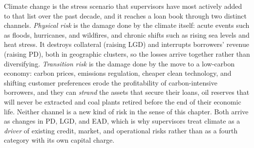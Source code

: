 \documentclass[../ai_in_finance]{subfiles}
\begin{document}
Climate change is the stress scenario that supervisors have most actively added to that list over the past decade, and it reaches a loan book through two distinct channels. \emph{Physical risk} is the damage done by the climate itself: acute events such as floods, hurricanes, and wildfires, and chronic shifts such as rising sea levels and heat stress. It destroys collateral (raising LGD) and interrupts borrowers' revenue (raising PD), both in geographic clusters, so the losses arrive together rather than diversifying. \emph{Transition risk} is the damage done by the move to a low-carbon economy: carbon prices, emissions regulation, cheaper clean technology, and shifting customer preferences erode the profitability of carbon-intensive borrowers, and they can \emph{strand} the assets that secure their loans, oil reserves that will never be extracted and coal plants retired before the end of their economic life. Neither channel is a new kind of risk in the sense of this chapter. Both arrive as changes in PD, LGD, and EAD, which is why supervisors treat climate as a \emph{driver} of existing credit, market, and operational risks rather than as a fourth category with its own capital charge.
\end{document}
